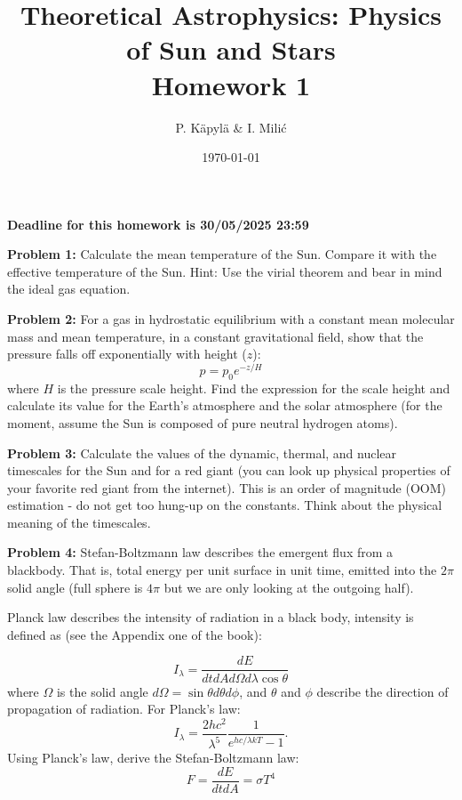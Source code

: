 \documentclass[12pt]{article}
\title{Theoretical Astrophysics: Physics of Sun and Stars\\
Homework 1}
\author{P. K\"{a}pyl\"{a} \& I. Mili\'{c}}
\date{\today}
\begin{document}
\maketitle

\textbf{Deadline for this homework is 30/05/2025 23:59}


{\bf Problem 1:} Calculate the mean temperature of the Sun. Compare it
with the effective temperature of the Sun. Hint: Use the virial
theorem and bear in mind the ideal gas equation.

{\bf Problem 2:} For a gas in hydrostatic equilibrium with a constant
mean molecular mass and mean temperature, in a constant gravitational
field, show that the pressure falls off exponentially with height
($z$):
\begin{equation}
p = p_0 e^{-z/H}
\end{equation}
where $H$ is the pressure scale height. Find the expression for the
scale height and calculate its value for the Earth's atmosphere and
the solar atmosphere (for the moment, assume the Sun is composed of
pure neutral hydrogen atoms).

{\bf Problem 3:} Calculate the values of the dynamic, thermal, and
nuclear timescales for the Sun and for a red giant (you can look up
physical properties of your favorite red giant from the
internet). This is an order of magnitude (OOM) estimation - do not get
too hung-up on the constants. Think about the physical meaning of the
timescales.

{\bf Problem 4:} Stefan-Boltzmann law describes the emergent flux from
a blackbody. That is, total energy per unit surface in unit time,
emitted into the $2\pi$ solid angle (full sphere is $4\pi$ but we are
only looking at the outgoing half).

Planck law describes the intensity of radiation in a black body,
intensity is defined as (see the Appendix one of the book):

\begin{equation}
I_\lambda = \frac{dE}{dt dA d\Omega d\lambda \cos \theta}
\end{equation}
where $\Omega$ is the solid angle $d\Omega = \sin \theta d\theta
d\phi$, and $\theta$ and $\phi$ describe the direction of propagation
of radiation. For Planck's law:
\begin{equation}
I_\lambda = \frac{2hc^2}{\lambda^5} \frac{1}{e^{hc/\lambda k T} - 1}.
\end{equation}
Using Planck's law, derive the Stefan-Boltzmann law:
\begin{equation}
F = \frac{dE}{dt dA} = \sigma T^4
\end{equation}
\end{document}
